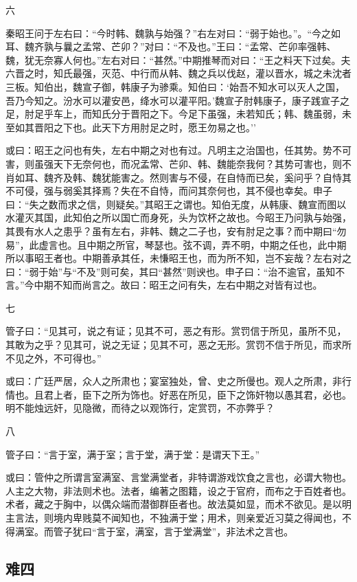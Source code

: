 \documentclass[]{article}
\begin{document}
六

秦昭王问于左右曰：``今时韩、魏孰与始强？''右左对曰：``弱于始也。''。``今之如耳、魏齐孰与曩之孟常、芒卯？''对曰：``不及也。''王曰：``孟常、芒卯率强韩、魏，犹无奈寡人何也。''左右对曰：``甚然。''中期推琴而对曰：``王之料天下过矣。夫六晋之时，知氏最强，灭范、中行而从韩、魏之兵以伐赵，灌以晋水，城之未沈者三板。知伯出，魏宣子御，韩康子为骖乘。知伯曰：`始吾不知水可以灭人之国，吾乃今知之。汾水可以灌安邑，绛水可以灌平阳。'魏宣子肘韩康子，康子践宣子之足，肘足乎车上，而知氏分于晋阳之下。今足下虽强，未若知氏；韩、魏虽弱，未至如其晋阳之下也。此天下方用肘足之时，愿王勿易之也。''

或曰：昭王之问也有失，左右中期之对也有过。凡明主之治国也，任其势。势不可害，则虽强天下无奈何也，而况孟常、芒卯、韩、魏能奈我何？其势可害也，则不肖如耳、魏齐及韩、魏犹能害之。然则害与不侵，在自恃而已矣，奚问乎？自恃其不可侵，强与弱奚其择焉？失在不自恃，而问其奈何也，其不侵也幸矣。申子曰：``失之数而求之信，则疑矣。''其昭王之谓也。知伯无度，从韩康、魏宣而图以水灌灭其国，此知伯之所以国亡而身死，头为饮杯之故也。今昭王乃问孰与始强，其畏有水人之患乎？虽有左右，非韩、魏之二子也，安有肘足之事？而中期曰``勿易''，此虚言也。且中期之所官，琴瑟也。弦不调，弄不明，中期之任也，此中期所以事昭王者也。中期善承其任，未慊昭王也，而为所不知，岂不妄哉？左右对之曰：``弱于始''与``不及''则可矣，其曰``甚然''则谀也。申子曰：``治不逾官，虽知不言。''今中期不知而尚言之。故曰：昭王之问有失，左右中期之对皆有过也。

七

管子曰：``见其可，说之有证；见其不可，恶之有形。赏罚信于所见，虽所不见，其敢为之乎？见其可，说之无证；见其不可，恶之无形。赏罚不信于所见，而求所不见之外，不可得也。''

或曰：广廷严居，众人之所肃也；宴室独处，曾、史之所僈也。观人之所肃，非行情也。且君上者，臣下之所为饰也。好恶在所见，臣下之饰奸物以愚其君，必也。明不能烛远奸，见隐微，而待之以观饰行，定赏罚，不亦弊乎？

八

管子曰：``言于室，满于室；言于堂，满于堂：是谓天下王。''

或曰：管仲之所谓言室满室、言堂满堂者，非特谓游戏饮食之言也，必谓大物也。人主之大物，非法则术也。法者，编著之图籍，设之于官府，而布之于百姓者也。术者，藏之于胸中，以偶众端而潜御群臣者也。故法莫如显，而术不欲见。是以明主言法，则境内卑贱莫不闻知也，不独满于堂；用术，则亲爱近习莫之得闻也，不得满室。而管子犹曰``言于室，满室，言于堂满堂''，非法术之言也。

\hypertarget{header-n1566}{%
\subsection{难四}\label{header-n1566}}
\end{document}
